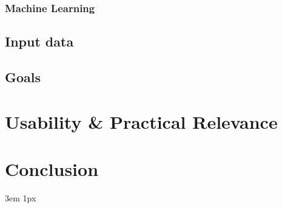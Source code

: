 \documentclass{Academic}
\begin{document}
    \subsubsection{Machine Learning} %

    \subsection{Input data}

    \subsection{Goals}


    \section{Usability \& Practical Relevance}


    \section{Conclusion}

    \singlespacing
    \emergencystretch 3em
    \hfuzz 1px
    \printbibliography[heading=bibnumbered]




\end{document}
